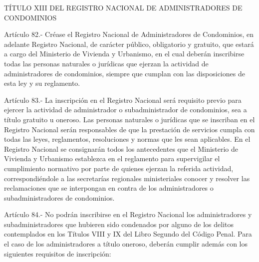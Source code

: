     TÍTULO XIII
    DEL REGISTRO NACIONAL DE ADMINISTRADORES DE CONDOMINIOS


    Artículo 82.- Créase el Registro Nacional de Administradores de Condominios, en adelante Registro Nacional, de carácter público, obligatorio y gratuito, que estará a cargo del Ministerio de Vivienda y Urbanismo, en el cual deberán inscribirse todas las personas naturales o jurídicas que ejerzan la actividad de administradores de condominios, siempre que cumplan con las disposiciones de esta ley y su reglamento.
     
    Artículo 83.- La inscripción en el Registro Nacional será requisito previo para ejercer la actividad de administrador o subadministrador de condominios, sea a título gratuito u oneroso.
    Las personas naturales o jurídicas que se inscriban en el Registro Nacional serán responsables de que la prestación de servicios cumpla con todas las leyes, reglamentos, resoluciones y normas que les sean aplicables.
    En el Registro Nacional se consignarán todos los antecedentes que el Ministerio de Vivienda y Urbanismo establezca en el reglamento para supervigilar el cumplimiento normativo por parte de quienes ejerzan la referida actividad, correspondiéndole a las secretarías regionales ministeriales conocer y resolver las reclamaciones que se interpongan en contra de los administradores o subadministradores de condominios.
     
    Artículo 84.- No podrán inscribirse en el Registro Nacional los administradores y subadministradores que hubieren sido condenados por alguno de los delitos contemplados en los Títulos VIII y IX del Libro Segundo del Código Penal.
    Para el caso de los administradores a título oneroso, deberán cumplir además con los siguientes requisitos de inscripción:
     
